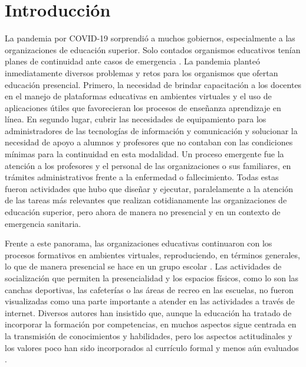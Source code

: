 \documentclass{textolivre}
\begin{document}
\section{Introducción}\label{sec-intro}
La pandemia por COVID-19 sorprendió a muchos gobiernos, especialmente a las organizaciones de educación superior. Solo contados organismos educativos tenían planes de continuidad ante casos de emergencia \cite{escuderohanon-ramirez2021, vicario}. %
La pandemia planteó inmediatamente diversos problemas y retos para los organismos que ofertan educación presencial. Primero, la necesidad de brindar capacitación a los docentes en el manejo de plataformas educativas en ambientes virtuales y el uso de aplicaciones útiles que favorecieran los procesos de enseñanza aprendizaje en línea. En segundo lugar, cubrir las necesidades de equipamiento para los administradores de las tecnologías de información y comunicación y solucionar la necesidad de apoyo a alumnos y profesores que no contaban con las condiciones mínimas para la continuidad en esta modalidad. Un proceso emergente fue la atención a los profesores y el personal de las organizaciones o sus familiares, en trámites administrativos frente a la enfermedad o fallecimiento.  Todas estas fueron actividades que hubo que diseñar y ejecutar, paralelamente a la atención de las tareas más relevantes que realizan cotidianamente las organizaciones de educación superior, pero ahora de manera no presencial y en un contexto de emergencia sanitaria. 

Frente a este panorama, las organizaciones educativas continuaron con los procesos formativos en ambientes virtuales, reproduciendo, en términos generales, lo que de manera presencial se hace en un grupo escolar \cite{escuderonahon2021}. Las actividades de socialización que permiten la presencialidad y los espacios físicos, como lo son las canchas deportivas, las cafeterías o las áreas de recreo en las escuelas, no fueron visualizadas como una parte importante a atender en las actividades a través de internet. Diversos autores \cite{cejasmartinez2019, asuninostroza2013} han insistido que, aunque la educación ha tratado de incorporar la formación por competencias, en muchos aspectos sigue centrada en la transmisión de conocimientos y habilidades, pero los aspectos actitudinales y los valores poco han sido incorporados al currículo formal y menos aún evaluados \cite{davis2015}.
\end{document}
